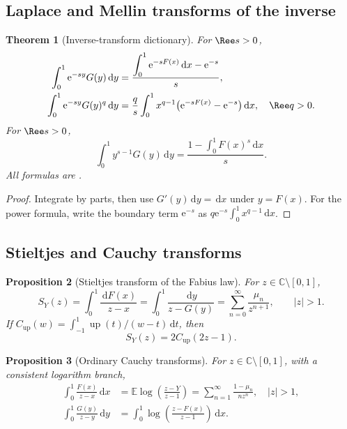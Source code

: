 \documentclass[11pt,oneside]{article}
\newtheorem{theorem}{Theorem}[section]
\newtheorem{proposition}[theorem]{Proposition}
\theoremstyle{definition}
\theoremstyle{remark}
\newcommand{\Up}{\operatorname{up}}
\newcommand{\E}{\mathbb E}
\newcommand{\C}{\mathbb C}
\newcommand{\dd}{\,\mathrm d}
\newcommand{\e}{\mathrm e}
\newcommand{\1}{\mathbf 1}
\begin{document}
\subsection{Laplace and Mellin transforms of the inverse}

\begin{theorem}[Inverse-transform dictionary]
\label{p7:thm:inverse-transform-dictionary}
For $\Ree s>0$,
\begin{align}
 \int_0^1\e^{-sy}G(y)\dd y
 &=\frac{\displaystyle\int_0^1\e^{-sF(x)}\dd x-\e^{-s}}s,
 \label{p7:eq:inverse-Laplace}\\
 \int_0^1\e^{-sy}G(y)^q\dd y
 &=\frac q s\int_0^1x^{q-1}
 \bigl(\e^{-sF(x)}-\e^{-s}\bigr)\dd x,
 \quad \Ree q>0.\label{p7:eq:inverse-power-Laplace}
\end{align}
For $\Ree s>0$,
\begin{equation}
 \int_0^1y^{s-1}G(y)\dd y
 =\frac{1-\displaystyle\int_0^1F(x)^s\dd x}{s}.
 \label{p7:eq:inverse-Mellin}
\end{equation}
All formulas are \statusproved.
\end{theorem}

\begin{proof}
Integrate by parts, then use $G'(y)\dd y=\dd x$ under $y=F(x)$.  For the power formula,
write the boundary term $\e^{-s}$ as
$q\e^{-s}\int_0^1x^{q-1}\dd x$.
\end{proof}

\subsection{Stieltjes and Cauchy transforms}

\begin{proposition}[Stieltjes transform of the Fabius law]
\label{p7:prop:Stieltjes}
For $z\in\C\setminus[0,1]$,
\begin{equation}
 S_Y(z)=\int_0^1\frac{\dd F(x)}{z-x}
 =\int_0^1\frac{\dd y}{z-G(y)}
 =\sum_{n=0}^{\infty}\frac{\mu_n}{z^{n+1}},\qquad |z|>1.
 \label{p7:eq:Stieltjes-Y}
\end{equation}
If
$C_{\Up}(w)=\int_{-1}^{1}\Up(t)/(w-t)\dd t$, then
\begin{equation}
 S_Y(z)=2C_{\Up}(2z-1).
 \label{p7:eq:Stieltjes-up}
\end{equation}
\end{proposition}

\begin{proposition}[Ordinary Cauchy transforms]
\label{p7:prop:ordinary-Cauchy}
For $z\in\C\setminus[0,1]$, with a consistent logarithm branch,
\begin{align}
 \int_0^1\frac{F(x)}{z-x}\dd x
 &=\E\log\!\left(\frac{z-Y}{z-1}\right)
 =\sum_{n=1}^{\infty}\frac{1-\mu_n}{nz^n},\quad |z|>1,
 \label{p7:eq:Cauchy-F}\\
 \int_0^1\frac{G(y)}{z-y}\dd y
 &=\int_0^1\log\!\left(\frac{z-F(x)}{z-1}\right)\dd x.
 \label{p7:eq:Cauchy-G}
\end{align}
\end{proposition}
\end{document}
